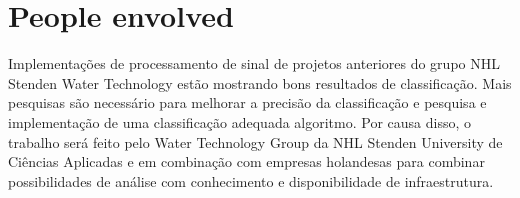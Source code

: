 \section{People envolved}
\label{sec:empresa}

Implementações de processamento de sinal de projetos anteriores
do grupo NHL Stenden Water Technology estão mostrando bons resultados de classificação. Mais pesquisas são
necessário para melhorar a precisão da classificação e pesquisa e implementação de uma classificação adequada
algoritmo. Por causa disso, o trabalho será feito pelo Water Technology Group da NHL Stenden University
de Ciências Aplicadas e em combinação com empresas holandesas para combinar possibilidades de análise com conhecimento
e disponibilidade de infraestrutura.


\clearpage